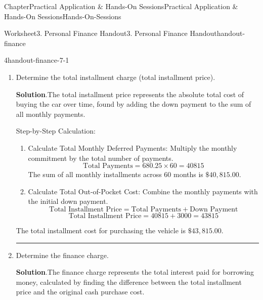 \documentclass[oneside,10pt,]{book}
\newcommand{\blocktitlefont}{\relax}
\newlength{\workspacestrutwidth}
\begin{document}
\begin{chapterptx}{Chapter}{Practical Application \& Hands-On Sessions}{}{Practical Application \& Hands-On Sessions}{}{}{Hands-On-Sessions}
\begin{worksheet-section}{Worksheet}{3. Personal Finance Handout}{}{3. Personal Finance Handout}{}{}{handout-finance}
\begin{divisionexercise}{4}{}{}{handout-finance-7-1}
\begin{enumerate}[font=\bfseries,label=(\alph*),ref=\alph*]
\par
%
\begin{equation*}
\text{Amount Financed} = \text{Purchase Cost} - \text{Down Payment}
\end{equation*}
%
\begin{equation*}
\text{Amount Financed} = 32500 - 3000 = 29500
\end{equation*}
%
\par
The base amount financed through the loan is \(\$29,500.00\).%
\par\rule{\workspacestrutwidth}{1in}%
\item{}Determine the total installment charge (total installment price).%
\par\smallskip%
\noindent\textbf{\blocktitlefont Solution}.\hypertarget{handout-finance-7-1-3-2}{}\quad{}The total installment price represents the absolute total cost of buying the car over time, found by adding the down payment to the sum of all monthly payments.%
\par
Step-by-Step Calculation:%
\begin{enumerate}[label={(\alph*)}]
\item{}Calculate Total Monthly Deferred Payments: Multiply the monthly commitment by the total number of payments.%
\begin{equation*}
\text{Total Payments} = 680.25 \times 60 = 40815
\end{equation*}
The sum of all monthly installments across 60 months is \(\$40,815.00\).%
\item{}Calculate Total Out-of-Pocket Cost: Combine the monthly payments with the initial down payment.%
\begin{equation*}
\text{Total Installment Price} = \text{Total Payments} + \text{Down Payment}
\end{equation*}
%
\begin{equation*}
\text{Total Installment Price} = 40815 + 3000 = 43815
\end{equation*}
%
\end{enumerate}
%
\par
The total installment cost for purchasing the vehicle is \(\$43,815.00\).%
\par\rule{\workspacestrutwidth}{1in}%
\item{}Determine the finance charge.%
\par\smallskip%
\noindent\textbf{\blocktitlefont Solution}.\hypertarget{handout-finance-7-1-4-2}{}\quad{}The finance charge represents the total interest paid for borrowing money, calculated by finding the difference between the total installment price and the original cash purchase cost.%

\end{enumerate}
\end{divisionexercise}
\end{worksheet-section}
\end{chapterptx}
\end{document}
